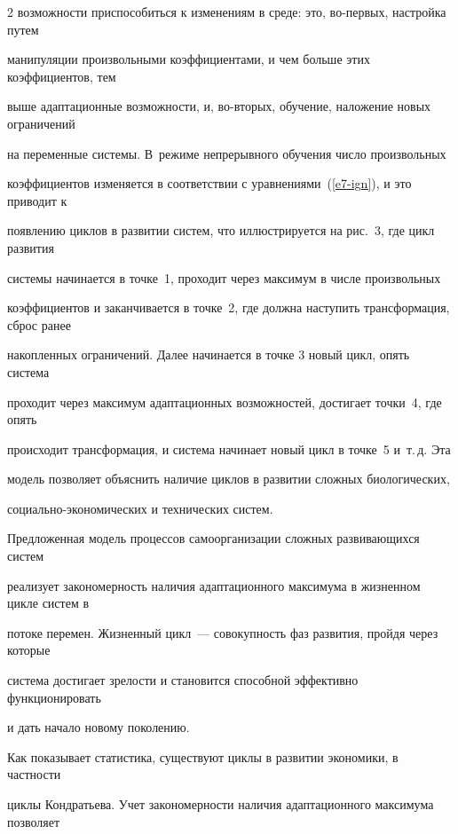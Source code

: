 \begin{multicols}{2}
возможности приспособиться к изменениям в среде: это, во-пер\-вых, настройка путем 


манипуляции произвольными коэф\-фи\-ци\-ен\-та\-ми, и чем больше этих коэффициентов, тем 


выше адаптационные возможности, и, во-вто\-рых, обучение, наложение новых ограничений 


на переменные сис\-те\-мы. В~режиме непрерывного обучения число произвольных 


коэффициентов изменяется в соответствии с уравнениями~(\ref{e7-ign}), и это приводит к 


появлению циклов в развитии сис\-тем, что ил\-люст\-ри\-ру\-ет\-ся на рис.~3, где цикл развития 


сис\-те\-мы начинается в точке~1, проходит через максимум в числе произвольных 


коэффициентов и заканчивается в точке~2, где должна наступить трансформация, сброс ранее 


накопленных ограничений. Далее начинается в точке 3 новый цикл, опять сис\-те\-ма 


проходит через максимум адаптационных возможностей, достигает точки~4, где опять 


происходит трансформация, и сис\-те\-ма начинает новый цикл в точке~5 и~т.\,д. Эта 


модель позволяет объяснить наличие циклов в развитии сложных биологических, 


со\-ци\-аль\-но-эко\-но\-ми\-че\-ских и технических сис\-тем.





      Предложенная модель процессов самоорганизации сложных развивающихся систем 


реализует закономерность наличия адаптационного максимума в жизненном цикле систем в 


потоке перемен. Жизненный цикл~--- совокупность фаз развития, пройдя через которые 


      сис\-те\-ма достигает зрелости и становится способной эффективно функционировать 


и дать начало новому поколению. 


      


      Как показывает статистика, существуют циклы в развитии экономики, в частности 


циклы Кондратьева. Учет закономерности наличия адаптационного максимума позволяет 



\end{multicols}
